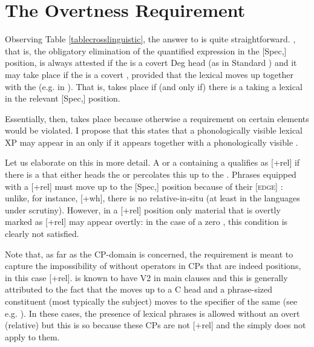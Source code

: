 \section{The Overtness Requirement} \label{sec:3overtnessrequirement}
Observing Table \ref{tablecrosslinguistic}, the answer to  is quite straightforward. , that is, the obligatory elimination of the quantified expression in the [Spec,] position, is always attested if the  is a covert Deg head (as in Standard ) and it may take place if the  is a covert  , provided that the lexical  moves up together with the  (e.g. in ). That is,  takes place if (and only if) there is a  taking a lexical  in the relevant [Spec,] position.

Essentially, then,  takes place because otherwise a requirement on certain  elements would be violated. I propose that this  states that a phonologically visible lexical XP may appear in an  only if it appears together with a phonologically visible .

Let us elaborate on this in more detail. A  or a  containing a  qualifies as [+rel] if there is a  that either heads the  or percolates this  up to the . Phrases equipped with a [+rel]  must move up to the [Spec,] position because of their [\textsc{edge}] : unlike, for instance, [+wh], there is no relative-in-situ (at least in the languages under scrutiny). However, in a [+rel] position only material that is overtly marked as [+rel] may appear overtly: in the case of a zero , this condition is clearly not satisfied. 

Note that, as far as the CP-domain is concerned, the  requirement is meant to capture the impossibility of  without operators in CPs that are indeed  positions, in this case [+rel].  is known to have V2 in main clauses and this is generally attributed to the fact that the  moves up to a C head and a phrase-sized constituent (most typically the subject) moves to the specifier of the same  (see e.g. \citealt{fanselow2004}). In these cases, the presence of lexical phrases is allowed without an overt (relative)  but this is so because these CPs are not [+rel] and the  simply does not apply to them.

